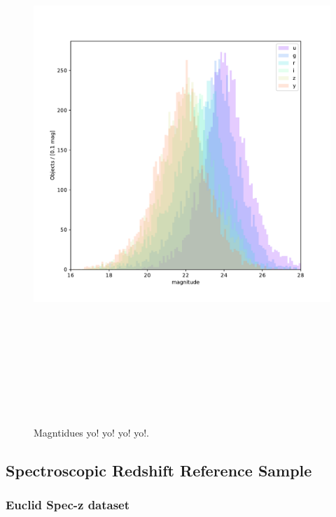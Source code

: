 \begin{figure}
    \centering
    \includegraphics[height=8in]{figures/mags.pdf}
    \caption{Magntidues yo! yo! yo! yo!.}
    \label{fig:dp_mags}
\end{figure}



\subsection{Spectroscopic Redshift Reference Sample}
\label{sec:data:reference}


\subsubsection{Euclid Spec-z dataset}
\label{sec:data:euclid}

